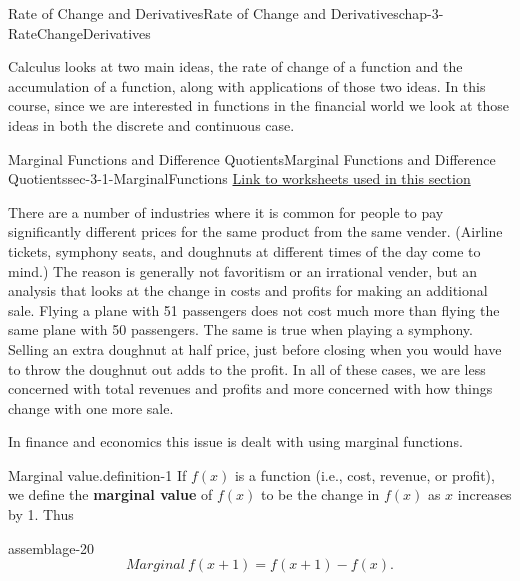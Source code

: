 \documentclass[oneside,10pt,]{book}
\newcommand{\terminology}[1]{\textbf{#1}}
\numberwithin{equation}{section}
\begin{document}
\begin{chapterptx}{Rate of Change and Derivatives}{}{Rate of Change and Derivatives}{}{}{chap-3-RateChangeDerivatives}
\begin{introduction}{}%
\hypertarget{p-897}{}%
Calculus looks at two main ideas, the rate of change of a function and the accumulation of a function, along with applications of those two ideas.  In this course, since we are interested in functions in the financial world we look at those ideas in both the discrete and continuous case.%
\end{introduction}%
%
%
\typeout{************************************************}
\typeout{************************************************}
%
\begin{sectionptx}{Marginal Functions and Difference Quotients}{}{Marginal Functions and Difference Quotients}{}{}{sec-3-1-MarginalFunctions}
\hypertarget{p-898}{}%
\href{./Examples/Section-3-1-Examples.xlsx}{Link to worksheets used in this section}%
\par
\hypertarget{p-899}{}%
There are a number of industries where it is common for people to pay significantly different prices for the same product from the same vender.  (Airline tickets, symphony seats, and doughnuts at different times of the day come to mind.)  The reason is generally not favoritism or an irrational vender, but an analysis that looks at the change in costs and profits for making an additional sale.  Flying a plane with 51 passengers does not cost much more than flying the same plane with 50 passengers.  The same is true when playing a symphony.  Selling an extra doughnut at half price, just before closing when you would have to throw the doughnut out adds to the profit.  In all of these cases, we are less concerned with total revenues and profits and more concerned with how things change with one more sale.%
\par
\hypertarget{p-900}{}%
In finance and economics this issue is dealt with using marginal functions.%
\begin{definition}{Marginal value.}{definition-1}%
\hypertarget{p-901}{}%
If \(f(x)\) is a function (i.e., cost, revenue, or profit), we define the \terminology{marginal value} of \(f(x)\) to be the change in \(f(x)\) as \(x\) increases by 1.  Thus%
\begin{assemblage}{}{assemblage-20}%
\hypertarget{p-902}{}%
%
\begin{equation*}
Marginal\ f(x+1)=f(x+1)-f(x).
\end{equation*}

\end{assemblage}
\end{definition}
\end{sectionptx}
\end{chapterptx}
\end{document}
